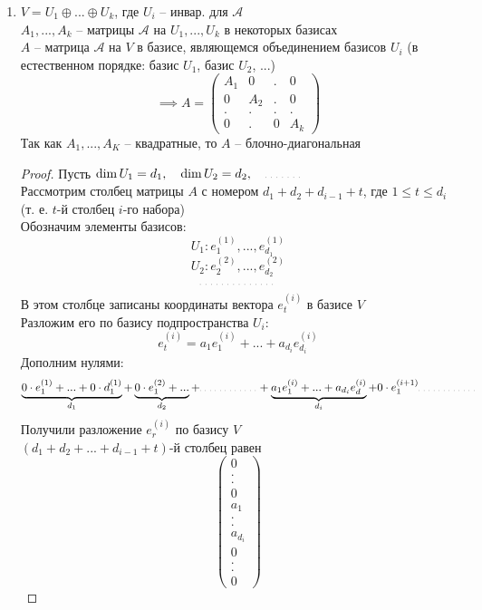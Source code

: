 \begin{theorem}
\begin{enumerate}
		\item $ V = U_1 \oplus ... \oplus U_k $, где $ U_i $ -- инвар. для $ \mathcal{A} $ \\
		$ A_1, ..., A_k $ -- матрицы $ \mathcal{A} $ на $ U_1, ..., U_k $ в некоторых базисах \\
		$ A $ -- матрица $ \mathcal{A} $ на $ V $ в базисе, являющемся объединением базисов $ U_i $ (в естественном порядке: базис $ U_1 $, базис $ U_2 $, ...)
		$$ \implies A =
		\begin{pmatrix}
			A_1 & 0 & . & 0 \\
			0 & A_2 & . & 0 \\
			. & . & . & . \\
			0 & . & 0 & A_k
		\end{pmatrix} $$
		Так как $ A_1, ..., A_K $ -- квадратные, то $ A $ -- блочно-диагональная
		\begin{proof}
			Пусть $ \dim U_1 = d_1, \quad \dim U_2 = d_2, \quad \widedots[3em] $ \\
			Рассмотрим столбец матрицы $ A $ с номером $ d_1 + d_2 + d_{i - 1} + t $, где $ 1 \le t \le d_i $ (т. е. $ t $-й столбец $ i $-го набора) \\
			Обозначим элементы базисов:
			$$ U_1 : e_1^{(1)}, ..., e_{d_1}^{(1)} $$
			$$ U_2 : e_2^{(2)}, ..., e_{d_2}^{(2)} $$
			$$ \widedots[6em] $$
			В этом столбце записаны координаты вектора $ e_t^{(i)} $ в базисе $ V $ \\
			Разложим его по базису подпространства $ U_i $:
			$$ e_t^{(i)} = a_1e_1^{(i)} + ... + a_{d_i}e_{d_i}^{(i)} $$
			Дополним нулями:
			$$ \underbrace{0 \cdot e_1^{(1)} + ... + 0 \cdot d_1^{(1)}}_{d_1} + \underbrace{0 \cdot e_1^{(2)} + ...}_{d_2} + \widedots[5em] + \underbrace{a_1e_1^{(i)} + ... + a_{d_i}e_d^{(i)}}_{d_i} + 0 \cdot e_1^{(i + 1)} \widedots[5em] $$
			Получили разложение $ e_r^{(i)} $ по базису $ V $ \\
			$ (d_1 + d_2 + ... + d_{i - 1} + t) $-й столбец равен
			$$
			\begin{pmatrix}
				0 \\
				. \\
				. \\
				0 \\
				a_1 \\
				. \\
				. \\
				a_{d_i} \\
				0 \\
				. \\
				. \\
				0
			\end{pmatrix} $$
		\end{proof}
	\end{enumerate}
\end{theorem}

